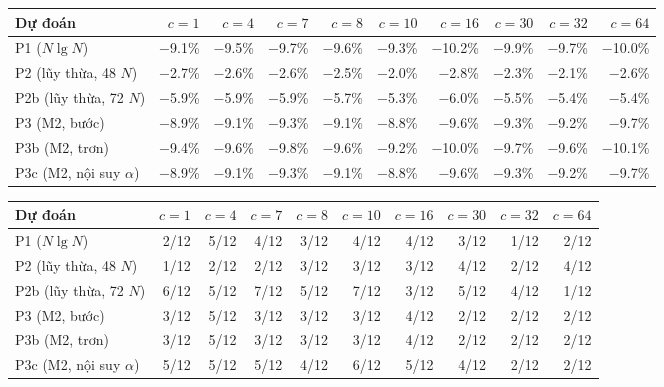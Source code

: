 \footnotesize
\begin{tabular}{lrrrrrrrrr}
\toprule
Dự đoán & $c{=}1$ & $c{=}4$ & $c{=}7$ & $c{=}8$ & $c{=}10$ & $c{=}16$ & $c{=}30$ & $c{=}32$ & $c{=}64$ \\
\midrule
P1 ($N\lg N$) & $-$9.1\% & $-$9.5\% & $-$9.7\% & $-$9.6\% & $-$9.3\% & $-$10.2\% & $-$9.9\% & $-$9.7\% & $-$10.0\% \\
P2 (lũy thừa, 48 $N$) & $-$2.7\% & $-$2.6\% & $-$2.6\% & $-$2.5\% & $-$2.0\% & $-$2.8\% & $-$2.3\% & $-$2.1\% & $-$2.6\% \\
P2b (lũy thừa, 72 $N$) & $-$5.9\% & $-$5.9\% & $-$5.9\% & $-$5.7\% & $-$5.3\% & $-$6.0\% & $-$5.5\% & $-$5.4\% & $-$5.4\% \\
P3 (M2, bước) & $-$8.9\% & $-$9.1\% & $-$9.3\% & $-$9.1\% & $-$8.8\% & $-$9.6\% & $-$9.3\% & $-$9.2\% & $-$9.7\% \\
P3b (M2, trơn) & $-$9.4\% & $-$9.6\% & $-$9.8\% & $-$9.6\% & $-$9.2\% & $-$10.0\% & $-$9.7\% & $-$9.6\% & $-$10.1\% \\
P3c (M2, nội suy $\alpha$) & $-$8.9\% & $-$9.1\% & $-$9.3\% & $-$9.1\% & $-$8.8\% & $-$9.6\% & $-$9.3\% & $-$9.2\% & $-$9.7\% \\
\bottomrule
\end{tabular}
\medskip

\begin{tabular}{lrrrrrrrrr}
\toprule
Dự đoán & $c{=}1$ & $c{=}4$ & $c{=}7$ & $c{=}8$ & $c{=}10$ & $c{=}16$ & $c{=}30$ & $c{=}32$ & $c{=}64$ \\
\midrule
P1 ($N\lg N$) & 2/12 & 5/12 & 4/12 & 3/12 & 4/12 & 4/12 & 3/12 & 1/12 & 2/12 \\
P2 (lũy thừa, 48 $N$) & 1/12 & 2/12 & 2/12 & 3/12 & 3/12 & 3/12 & 4/12 & 2/12 & 4/12 \\
P2b (lũy thừa, 72 $N$) & 6/12 & 5/12 & 7/12 & 5/12 & 7/12 & 3/12 & 5/12 & 4/12 & 1/12 \\
P3 (M2, bước) & 3/12 & 5/12 & 3/12 & 3/12 & 3/12 & 4/12 & 2/12 & 2/12 & 2/12 \\
P3b (M2, trơn) & 3/12 & 5/12 & 3/12 & 3/12 & 3/12 & 4/12 & 2/12 & 2/12 & 2/12 \\
P3c (M2, nội suy $\alpha$) & 5/12 & 5/12 & 5/12 & 4/12 & 6/12 & 5/12 & 4/12 & 2/12 & 2/12 \\
\bottomrule
\end{tabular}
